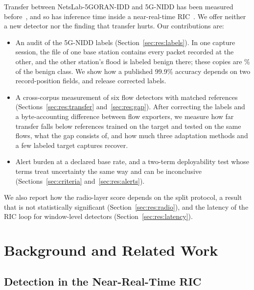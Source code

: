 Transfer between NetsLab-5GORAN-IDD and 5G-NIDD has been measured before~\cite{abraheem2026bidirectional}, and so has inference time inside a near-real-time RIC~\cite{obiuwevwi2026realtime}. We offer neither a new detector nor the finding that transfer hurts. Our contributions are:
\begin{itemize}
\item An audit of the 5G-NIDD labels (Section~\ref{sec:res:labels}). In one capture session, the file of one base station contains every packet recorded at the other, and the other station's flood is labeled benign there; these copies are \RCopiesPct\% of the benign class. We show how a published 99.9\% accuracy depends on two record-position fields, and release corrected labels.
\item A cross-corpus measurement of six flow detectors with matched references (Sections~\ref{sec:res:transfer} and~\ref{sec:res:gap}). After correcting the labels and a byte-accounting difference between flow exporters, we measure how far transfer falls below references trained on the target and tested on the same flows, what the gap consists of, and how much three adaptation methods and a few labeled target captures recover.
\item Alert burden at a declared base rate, and a two-term deployability test whose terms treat uncertainty the same way and can be inconclusive (Sections~\ref{sec:criteria} and~\ref{sec:res:alerts}).
\end{itemize}
We also report how the radio-layer score depends on the split protocol, a result that is not statistically significant (Section~\ref{sec:res:radio}), and the latency of the RIC loop for window-level detectors (Section~\ref{sec:res:latency}).

\section{Background and Related Work}
\label{sec:related}

\subsection{Detection in the Near-Real-Time RIC}

